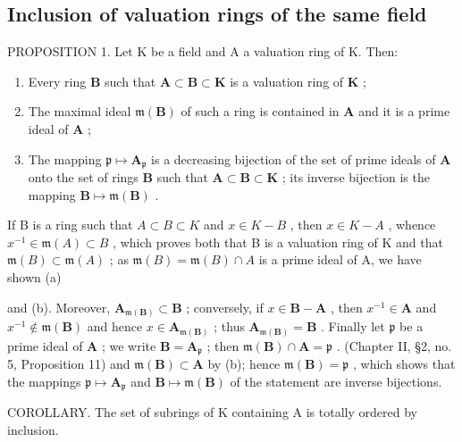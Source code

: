 \subsection{Inclusion of valuation rings of the same field}

PROPOSITION 1. Let K be a field and A a valuation ring of K. Then:

\begin{enumerate}
\def\labelenumi{(\alph{enumi})}
\item
  Every ring \(\mathbf{B}\) such that \(\mathbf{A} \subset \mathbf{B} \subset \mathbf{K}\) is a valuation ring of \(\mathbf{K}\) ;
\item
  The maximal ideal \(\mathfrak{m}(\mathbf{B})\) of such a ring is contained in \(\mathbf{A}\) and it is a prime ideal of \(\mathbf{A}\) ;
\item
  The mapping \(\mathfrak{p} \mapsto \mathbf{A}_{\mathfrak{p}}\) is a decreasing bijection of the set of prime ideals of \(\mathbf{A}\) onto the set of rings \(\mathbf{B}\) such that \(\mathbf{A} \subset \mathbf{B} \subset \mathbf{K}\) ; its inverse bijection is the mapping \(\mathbf{B} \mapsto \mathfrak{m}(\mathbf{B})\) .
\end{enumerate}

If B is a ring such that \(A \subset B \subset K\) and \(x \in K - B\) , then \(x \in K - A\) , whence \(x^{-1} \in \mathfrak{m}(A) \subset B\) , which proves both that B is a valuation ring of K and that \(\mathfrak{m}(B) \subset \mathfrak{m}(A)\) ; as \(\mathfrak{m}(B) = \mathfrak{m}(B) \cap A\) is a prime ideal of A, we have shown (a)

and (b). Moreover, \(\mathbf{A}_{\mathfrak{m}(\mathbf{B})} \subset \mathbf{B}\) ; conversely, if \(x \in \mathbf{B} - \mathbf{A}\) , then \(x^{-1} \in \mathbf{A}\) and \(x^{-1} \notin \mathfrak{m}(\mathbf{B})\) and hence \(x \in \mathbf{A}_{\mathfrak{m}(\mathbf{B})}\) ; thus \(\mathbf{A}_{\mathfrak{m}(\mathbf{B})} = \mathbf{B}\) . Finally let \(\mathfrak{p}\) be a prime ideal of \(\mathbf{A}\) ; we write \(\mathbf{B} = \mathbf{A}_{\mathfrak{p}}\) ; then \(\mathfrak{m}(\mathbf{B}) \cap \mathbf{A} = \mathfrak{p}\) . (Chapter II, §2, no. 5, Proposition 11) and \(\mathfrak{m}(\mathbf{B}) \subset \mathbf{A}\) by (b); hence \(\mathfrak{m}(\mathbf{B}) = \mathfrak{p}\) , which shows that the mappings \(\mathfrak{p} \mapsto \mathbf{A}_{\mathfrak{p}}\) and \(\mathbf{B} \mapsto \mathfrak{m}(\mathbf{B})\) of the statement are inverse bijections.

COROLLARY. The set of subrings of K containing A is totally ordered by inclusion.

